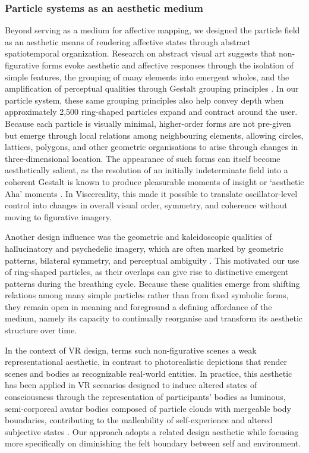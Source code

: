 \subsubsection{Particle systems as an aesthetic medium}

Beyond serving as a medium for affective mapping, we designed the particle field as an aesthetic means of rendering affective states through abstract spatiotemporal organization. Research on abstract visual art suggests that non-figurative forms evoke aesthetic and affective responses through the isolation of simple features, the grouping of many elements into emergent wholes, and the amplification of perceptual qualities through Gestalt grouping principles \citep{deRooij2013, Ramachandran1999}. In our particle system, these same grouping principles also help convey depth when approximately 2,500 ring-shaped particles expand and contract around the user. Because each particle is visually minimal, higher-order forms are not pre-given but emerge through local relations among neighbouring elements, allowing circles, lattices, polygons, and other geometric organisations to arise through changes in three-dimensional location. The appearance of such forms can itself become aesthetically salient, as the resolution of an initially indeterminate field into a coherent Gestalt is known to produce pleasurable moments of insight or `aesthetic Aha' moments \citep{muth2013aesthetic, spehar2017koffka, spee2024dynamics}. In Viscereality, this made it possible to translate oscillator-level control into changes in overall visual order, symmetry, and coherence without moving to figurative imagery.

Another design influence was the geometric and kaleidoscopic qualities of hallucinatory and psychedelic imagery, which are often marked by geometric patterns, bilateral symmetry, and perceptual ambiguity \citep{Kluver1966, Billock2012, Lawrence2022, Rubin2010}. This motivated our use of ring-shaped particles, as their overlaps can give rise to distinctive emergent patterns during the breathing cycle. Because these qualities emerge from shifting relations among many simple particles rather than from fixed symbolic forms, they remain open in meaning and foreground a defining affordance of the medium, namely its capacity to continually reorganise and transform its aesthetic structure over time.

In the context of VR design, \citet{Glowacki2024} terms such non-figurative scenes a weak representational aesthetic, in contrast to photorealistic depictions that render scenes and bodies as recognizable real-world entities. In practice, this aesthetic has been applied in VR scenarios designed to induce altered states of consciousness through the representation of participants' bodies as luminous, semi-corporeal avatar bodies composed of particle clouds with mergeable body boundaries, contributing to the malleability of self-experience and altered subjective states \citep{Glowacki2020, Glowacki2022, Glowacki2024, vidal2025inducing}. Our approach adopts a related design aesthetic while focusing more specifically on diminishing the felt boundary between self and environment.


